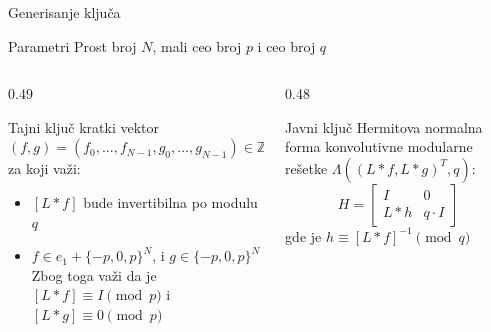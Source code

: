 \documentclass[aspectratio=1610]{beamer}
\begin{document}
\begin{frame}{Generisanje ključa}
    \begin{block}{Parametri}
        Prost broj $N$, mali ceo broj $p$ i ceo broj $q$
    \end{block}

    \begin{columns}[T]
        \begin{column}{0.49\linewidth}
            \begin{exampleblock}{Tajni ključ}
                kratki vektor $(f, g) = (f_0, ..., f_{N-1}, g_0,..., g_{N-1}) \in \mathbb{Z}^{2N}$ za koji važi:
                \begin{itemize}
                    \item $[L\ast f]$ bude invertibilna po modulu $q$
    \item $f \in e_1 + \{-p, 0, p\}^N$,  i $g \in \{-p, 0, p\}^N$ Zbog toga važi da je $[L \ast f] \equiv I \pmod p$ i $[L \ast g] \equiv 0 \pmod p$
                \end{itemize}
            \end{exampleblock}
        \end{column}

        \begin{column}{0.48\linewidth}
            \begin{exampleblock}{Javni ključ}
                Hermitova normalna forma konvolutivne modularne rešetke $\Lambda((L \ast f, L\ast g)^T, q)$:
                \[H = \begin{bmatrix}
                    I & 0\\
                    L\ast h & q \cdot I
                    \end{bmatrix}\]
                gde je $h \equiv [L \ast f]^{-1} \pmod q$
            \end{exampleblock}
        \end{column}
    \end{columns}
\end{frame}
\end{document}
